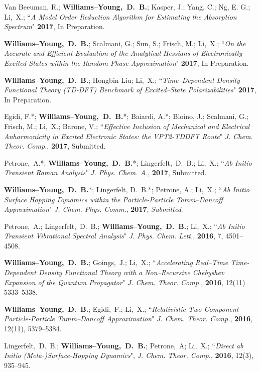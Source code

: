 \documentclass[10pt]{res} %
\newcommand*\me[0]{{\bf Williams--Young,~D.~B.}}
\newcommand*\xsli[0]{Li,~X.}
\begin{document}
\begin{resume}
\begin{etaremune}
  \item Van Beeuman, R.; \me; Kasper, J.; Yang, C.; Ng, E. G.; \xsli;
        ``\emph{A Model Order Reduction Algorithm for Estimating the 
	        Absorption Spectrum}"
        \textbf{2017}, In Preparation.
  \item \me; Scalmani, G.; Sun, S.; Frisch, M.; \xsli;
        ``\emph{On the Accurate and Efficient Evaluation of the 
	        Analytical Hessians of Electronically Excited States 
		within the Random Phase Approximation}"
        \textbf{2017}, In Preparation.
  \item \me; Hongbin Liu; \xsli;
        ``\emph{Time--Dependent Density Functional Theory (TD-DFT) Benchmark
	        of Excited--State Polarizabilities}"
        \textbf{2017}, In Preparation.
  \item Egidi, F.*; \me*; Baiardi, A.*; Bloino, J.; Scalmani, G.; Frisch, M.; 
        \xsli; Barone, V.; 
        ``\emph{Effective Inclusion of Mechanical and Electrical Anharmonicity in 
                Excited Electronic States: the VPT2-TDDFT Route}"
          \emph{J. Chem. Theor. Comp.}, \textbf{2017}, Submitted.
  \item Petrone,~A.*; \me*; Lingerfelt,~D.~B.; \xsli;
        ``\emph{Ab Initio Transient Raman Analysis}"
	  \emph{J. Phys. Chem. A.}, \textbf{2017}, Submitted.
  \item \me*; Lingerfelt, D.~B.*; Petrone, A.; \xsli;
	``\emph{Ab Initio Surface Hopping Dynamics within the Particle-Particle 
	        Tamm--Dancoff Approximation}"
          \emph{J. Chem. Phys. Comm.}, \textbf{2017}, \emph{Submitted}.
  \item Petrone,~A.; Lingerfelt,~D.~B.; \me; \xsli;
        ``\emph{Ab Initio Transient Vibrational Spectral Analysis}"
	  \emph{J. Phys. Chem. Lett.}, \textbf{2016}, 7, 4501--4508.
  \item \me; Goings,~J.; \xsli;
	``\emph{Accelerating Real--Time Time-Dependent Density Functional Theory 
	        with a Non--Recursive Chebyshev Expansion of the Quantum 
                Propagator}"
	  \emph{J. Chem. Theor. Comp.}, \textbf{2016}, 12(11) 5333--5338.
  \item \me; Egidi,~F.; \xsli;
	``\emph{Relativistic Two-Component Particle-Particle Tamm--Dancoff 
	        Approximation}"
	  \emph{J. Chem. Theor. Comp.}, \textbf{2016}, 12(11), 5379--5384.
  \item Lingerfelt,~D.~B.; \me; Petrone,~A; \xsli; 
        ``\emph{Direct ab Initio (Meta-)Surface-Hopping Dynamics}", 
        \emph{J. Chem. Theor. Comp.}, \textbf{2016}, 12(3), 935--945.
\end{etaremune}
%



\end{resume}
\end{document}
